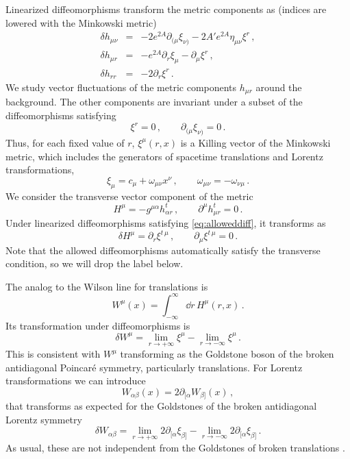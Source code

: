 Linearized diffeomorphisms transform the metric components as (indices are lowered with the Minkowski metric)
\begin{eqnarray}
	\delta h_{\mu\nu}&=&-2e^{2A}\partial_{(\mu}\xi_{\nu)}-2A'e^{2A}\eta_{\mu\nu}\xi^r\,,\\
	\delta h_{\mu r} &=& -e^{2A}\partial_r \xi_\mu-\partial_\mu \xi^r\,,\\
	\delta h_{rr} &=& -2\partial_r\xi^r\,.
\end{eqnarray}
We study vector fluctuations of the metric components $h_{\mu r}$ around the background.
The other components are invariant under a subset of the diffeomorphisms satisfying
\begin{equation}\label{eq:alloweddiff}
     \xi^r=0
     \,,\qquad \partial_{(\mu}\xi_{\nu)}=0
     \,.
\end{equation}
Thus, for each fixed value of $r$, $\xi^\mu(r,x)$ is a Killing vector of the Minkowski metric, which includes the generators of spacetime translations and Lorentz transformations,
\begin{equation}
	\xi_\mu=c_\mu+\omega_{\mu\nu} x^\nu
	\,,\qquad
	\omega_{\mu\nu}=-\omega_{\nu\mu}\,.
\end{equation}
We consider the transverse vector component of the metric 
\begin{equation}
	H^\mu=-g^{\mu\alpha}h_{\alpha r}^t
	\,,\qquad 
	\partial^\mu h_{\mu r}^t=0\,.
\end{equation}
Under linearized diffeomorphisms satisfying \cref{eq:alloweddiff}, it transforms as
\begin{equation}
	\delta H^\mu=\partial_r \xi^{t\,\mu}
	\,,\qquad
	\partial_\mu \xi^{t\,\mu}=0\,. 
\end{equation}
Note that the allowed diffeomorphisms  automatically satisfy the transverse condition, so we will drop the label below.

The analog to the Wilson line for translations is
\begin{equation}\label{eq:Wm}
	W^\mu(x)=\int_{-\infty}^\infty \dd r\, H^\mu(r,x)\,.
\end{equation}
Its transformation under diffeomorphisms is 
\begin{equation}
	\delta W^\mu=\lim_{r\to +\infty} \xi^\mu -\lim_{r\to -\infty} \xi^\mu\,.
\end{equation}
This is consistent with $W^\mu$ transforming as the Goldstone boson of the broken antidiagonal Poincar\'e symmetry, particularly translations.
For Lorentz transformations we can introduce
\begin{equation}
	W_{\alpha\beta}(x)=2\partial_{[\alpha} W_{\beta]}(x)\,,
\end{equation}
that transforms as expected for the Goldstones of the broken antidiagonal Lorentz symmetry
\begin{equation}
	\delta W_{\alpha\beta}=\lim_{r\to +\infty} 2\partial_{[\alpha}\xi_{\beta]} -\lim_{r\to -\infty} 2\partial_{[\alpha}\xi_{\beta]}\,.
\end{equation}
As usual, these are not independent from the Goldstones of broken translations \cite{Low:2001bw}.

